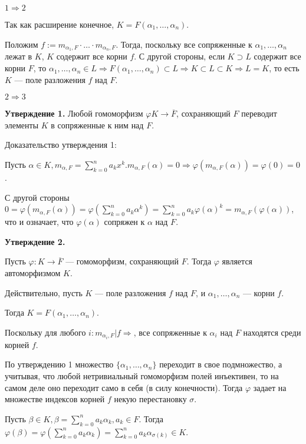 \(1 \Rightarrow 2\)

Так как расширение конечное, \(K = F(\alpha_1, \ldots, \alpha_n)\).

Положим \(f := m_{\alpha_1, F} \cdot \ldots \cdot m_{\alpha_n, F}\). Тогда, поскольку все сопряженные к \(\alpha_1, \ldots, \alpha_n\) лежат в \(K\), \(K\) содержит все корни \(f\). С другой стороны, если \(K \supset L\) содержит все корни \(F\), то \(\alpha_1, \ldots, \alpha_n \in L \Rightarrow F(\alpha_1, \ldots, \alpha_n) \subset L \Rightarrow K \subset L \subset K \Rightarrow L = K\), то есть \(K\) --- поле разложения \(f\) над \(F\).

\(2 \Rightarrow 3\)

\textbf{Утверждение 1.} Любой гомоморфизм \(\varphi K \to \overline{F}\), сохраняющий \(F\) переводит элементы \(K\) в сопряженные к ним над \(F\).

Доказательство утверждения 1:

Пусть \(\alpha \in K, m_{\alpha, F} = \sum\limits_{k=0}^n a_kx^k. m_{\alpha, F}(\alpha) = 0 \Rightarrow \varphi(m_{\alpha, F}(\alpha)) = \varphi(0) = 0\).

С другой стороны \(0 = \varphi(m_{\alpha, F}(\alpha)) = \varphi(\sum\limits_{k=0}^n a_k \alpha^k) = \sum\limits_{k=0}^n a_k \varphi(\alpha)^k = m_{\alpha, F}(\varphi(\alpha))\),
что и означает, что \(\varphi(\alpha)\) сопряжен к \(\alpha\) над \(F\).

\hypertarget{9.1.statement.2}{\textbf{Утверждение 2.}}
Пусть \(\varphi: K \to \overline{F}\) --- гомоморфизм, сохраняющий \(F\). Тогда \(\varphi\) является автоморфизмом \(K\).

Действительно, пусть \(K\) --- поле разложения \(f\) над \(F\), и
\(\alpha_1, \ldots, \alpha_n\) --- корни \(f\).

Тогда \(K = F(\alpha_1, \ldots, \alpha_n)\).

Поскольку для любого \(i: m_{\alpha_i, F} | f \Rightarrow\), все сопряженные к \(\alpha_i\) над \(F\) находятся среди корней \(f\).

По утверждению 1 множество \(\{\alpha_1, \ldots, \alpha_n\}\) переходит в свое подмножество, а учитывая, что любой нетривиальный гомоморфизм полей инъективен, то на самом деле оно переходит само в себя (в силу конечности). Тогда \(\varphi\) задает на множестве индексов корней \(f\) некую перестановку \(\sigma\).

Пусть \(\beta \in K, \beta = \sum\limits_{k=0}^n a_k \alpha_k, a_k \in F\). Тогда \(\varphi(\beta) = \varphi(\sum\limits_{k=0}^n a_k \alpha_k) = \sum\limits_{k=0}^n a_k \alpha_{\sigma(k)} \in K\).

